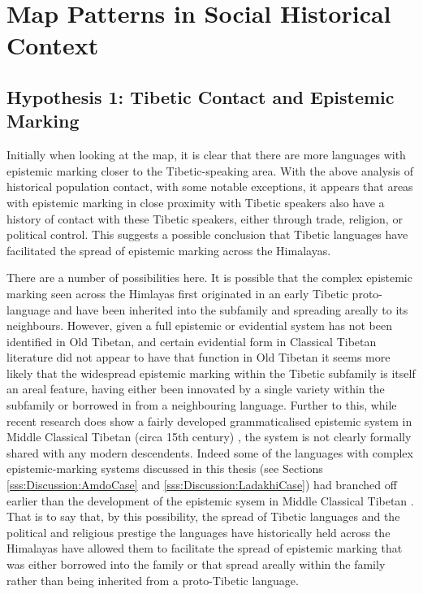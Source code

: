 \section{Map Patterns in Social Historical Context}\label{s:History:Correlations}
\subsection{Hypothesis 1: Tibetic Contact and Epistemic Marking}
Initially when looking at the map, it is clear that there are more languages with epistemic marking closer to the Tibetic-speaking area. With the above analysis of historical population contact, with some notable exceptions, it appears that areas with epistemic marking in close proximity with Tibetic speakers also have a history of contact with these Tibetic speakers, either through trade, religion, or political control. This suggests a possible conclusion that Tibetic languages have facilitated the spread of epistemic marking across the Himalayas. 

There are a number of possibilities here. It is possible that the complex epistemic marking seen across the Himlayas first originated in an early Tibetic proto-language and have been inherited into the subfamily and spreading areally to its neighbours. However, given a full epistemic or evidential system has not been identified in Old Tibetan, and certain evidential form in Classical Tibetan literature did not appear to have that function in Old Tibetan \cite{Hill2014} it seems more likely that the widespread epistemic marking within the Tibetic subfamily is itself an areal feature, having either been innovated by a single variety within the subfamily or borrowed in from a neighbouring language. Further to this, while recent research does show a fairly developed grammaticalised epistemic system in Middle Classical Tibetan (circa 15th century) \cite{Oisel2024}, the system is not clearly formally shared with any modern descendents. Indeed some of the languages with complex epistemic-marking systems discussed in this thesis (see Sections \ref{sss:Discussion:AmdoCase} and \ref{sss:Discussion:LadakhiCase}) had branched off earlier than the development of the epistemic sysem in Middle Classical Tibetan \cite{Bialek2018}. That is to say that, by this possibility, the spread of Tibetic languages and the political and religious prestige the languages have historically held across the Himalayas have allowed them to facilitate the spread of epistemic marking that was either borrowed into the family or that spread areally within the family rather than being inherited from a proto-Tibetic language.

